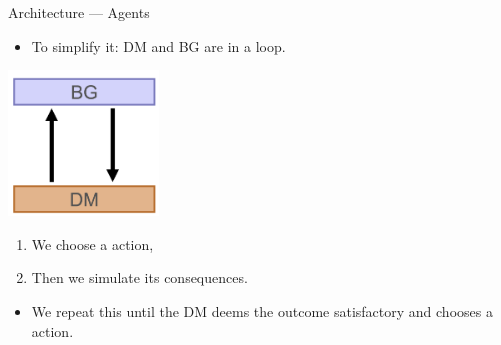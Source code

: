    \begin{frame}{Architecture --- Agents}
      \begin{itemize}
         \item To simplify it: DM and BG are in a loop.
      \end{itemize}
      
      \begin{center}
         \includegraphics[width=0.3\textwidth]{bg_dm_loop.png}
      \end{center}
      
      \begin{enumerate}
         \item We choose a  action,
         \item Then we simulate its consequences.
      \end{enumerate}
      
      \begin{itemize}
         \item We repeat this until the DM deems the outcome satisfactory and chooses a  action.
      \end{itemize}
   \end{frame}
   
